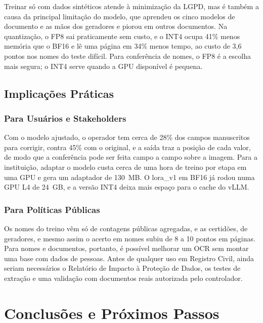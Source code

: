 \documentclass[12pt,a4paper]{article}
\begin{document}
Treinar só com dados sintéticos atende à minimização da LGPD, mas é também a causa da principal limitação do modelo, que aprendeu os cinco modelos de documento e as mãos dos geradores e piorou em outros documentos. Na quantização, o FP8 sai praticamente sem custo, e o INT4 ocupa 41\% menos memória que o BF16 e lê uma página em 34\% menos tempo, ao custo de 3,6 pontos nos nomes do teste difícil. Para conferência de nomes, o FP8 é a escolha mais segura; o INT4 serve quando a GPU disponível é pequena.

\subsection{Implicações Práticas}

\subsubsection{Para Usuários e Stakeholders}
Com o modelo ajustado, o operador tem cerca de 28\% dos campos manuscritos para corrigir, contra 45\% com o original, e a saída traz a posição de cada valor, de modo que a conferência pode ser feita campo a campo sobre a imagem. Para a instituição, adaptar o modelo custa cerca de uma hora de treino por etapa em uma GPU e gera um adaptador de 130~MB. O lora\_v1 em BF16 já rodou numa GPU L4 de 24~GB, e a versão INT4 deixa mais espaço para o cache do vLLM.

\subsubsection{Para Políticas Públicas}
Os nomes do treino vêm só de contagens públicas agregadas, e as certidões, de geradores, e mesmo assim o acerto em nomes subiu de 8 a 10 pontos em páginas. Para nomes e documentos, portanto, é possível melhorar um OCR sem montar uma base com dados de pessoas. Antes de qualquer uso em Registro Civil, ainda seriam necessários o Relatório de Impacto à Proteção de Dados, os testes de extração e uma validação com documentos reais autorizada pelo controlador.

\section{Conclusões e Próximos Passos}
\label{sec:conclusoes}
\end{document}
